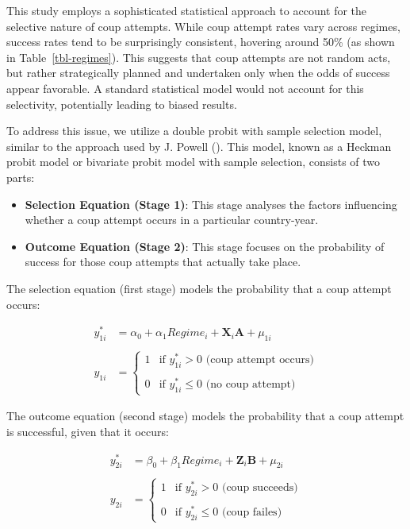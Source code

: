 \documentclass[
  12pt,
]{report}
\begin{document}
This study employs a sophisticated statistical approach to account for
the selective nature of coup attempts. While coup attempt rates vary
across regimes, success rates tend to be surprisingly consistent,
hovering around 50\% (as shown in Table~\ref{tbl-regimes}). This
suggests that coup attempts are not random acts, but rather
strategically planned and undertaken only when the odds of success
appear favorable. A standard statistical model would not account for
this selectivity, potentially leading to biased results.

To address this issue, we utilize a double probit with sample selection
model, similar to the approach used by J. Powell
(). This model, known as a Heckman probit
model or bivariate probit model with sample selection, consists of two
parts:

\begin{itemize}
\item
  \textbf{Selection Equation (Stage 1)}: This stage analyses the factors
  influencing whether a coup attempt occurs in a particular
  country-year.
\item
  \textbf{Outcome Equation (Stage 2)}: This stage focuses on the
  probability of success for those coup attempts that actually take
  place.
\end{itemize}

The selection equation (first stage) models the probability that a coup
attempt occurs:

\[
\begin{aligned}
y_{1i}^*&=\alpha_0 + \alpha_1 Regime_i + \mathbf{X}_i \boldsymbol{A} + \mu_{1i}
\\
\\
y_{1i} &= 
\begin{cases} 
1 &\text{if $y_{1i}^*>0$ (coup attempt occurs)} \\
\\
0 &\text{if $y_{1i}^*\le0$ (no coup attempt)}
\end{cases}
\end{aligned}
\]

The outcome equation (second stage) models the probability that a coup
attempt is successful, given that it occurs:

\[
\begin{aligned}
y_{2i}^*&=\beta_0 + \beta_1 Regime_i + \mathbf{Z}_i \boldsymbol{B} + \mu_{2i}
\\
\\
y_{2i} &= 
\begin{cases} 
1 &\text{if $y_{2i}^*>0$ (coup succeeds)} \\
\\
0 &\text{if $y_{2i}^*\le0$ (coup failes)}
\end{cases}
\end{aligned}
\]
\end{document}
